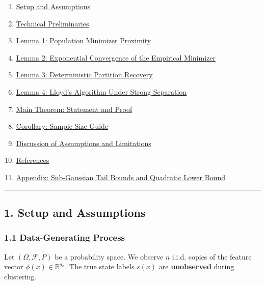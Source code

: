 \documentclass[
  12pt,
]{article}
\providecommand{\tightlist}{%
  \setlength{\itemsep}{0pt}\setlength{\parskip}{0pt}}
\begin{document}
\begin{enumerate}
\def\labelenumi{\arabic{enumi}.}
\tightlist
\item
  \hyperref[1-setup-and-assumptions]{Setup and Assumptions}
\item
  \hyperref[2-technical-preliminaries]{Technical Preliminaries}
\item
  \hyperref[3-lemma-1-population-minimizer-proximity]{Lemma 1:
  Population Minimizer Proximity}
\item
  \hyperref[4-lemma-2-exponential-convergence-of-the-empirical-minimizer]{Lemma
  2: Exponential Convergence of the Empirical Minimizer}
\item
  \hyperref[5-lemma-3-deterministic-partition-recovery]{Lemma 3:
  Deterministic Partition Recovery}
\item
  \hyperref[6-lemma-4-lloyds-algorithm-under-strong-separation]{Lemma 4:
  Lloyd's Algorithm Under Strong Separation}
\item
  \hyperref[7-main-theorem-statement-and-proof]{Main Theorem: Statement
  and Proof}
\item
  \hyperref[8-corollary-sample-size-guide]{Corollary: Sample Size Guide}
\item
  \hyperref[9-discussion-of-assumptions-and-limitations]{Discussion of
  Assumptions and Limitations}
\item
  \hyperref[10-references]{References}
\item
  \hyperref[11-appendix-sub-gaussian-tail-bounds-and-quadratic-lower-bound]{Appendix:
  Sub-Gaussian Tail Bounds and Quadratic Lower Bound}
\end{enumerate}

\begin{center}\rule{0.5\linewidth}{0.5pt}\end{center}

\subsection{1. Setup and Assumptions}\label{setup-and-assumptions}

\subsubsection{1.1 Data-Generating
Process}\label{data-generating-process}

Let \((\Omega, \mathcal{F}, P)\) be a probability space. We observe
\(n\) i.i.d. copies of the feature vector
\(\phi(x) \in \mathbb{R}^{d_\phi}\). The true state labels \(s(x)\) are
\textbf{unobserved} during clustering.
\end{document}
